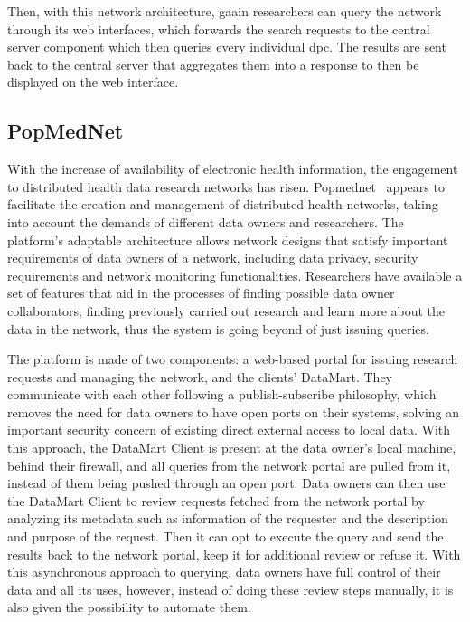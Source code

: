 Then, with this network architecture, \gls{gaain} researchers can query the network through its web interfaces, which forwards the search requests to the central server component which then queries every individual \gls{dpc}.
The results are sent back to the central server that aggregates them into a response to then be displayed on the web interface.

\subsection*{PopMedNet}
With the increase of availability of electronic health information, the engagement to distributed health data research networks has risen.
Popmednet~\cite{popmednet} appears to facilitate the creation and management of distributed health networks, taking into account the demands of different data owners and researchers.
The platform's adaptable architecture allows network designs that satisfy important requirements of data owners of a network, including data privacy, security requirements and network monitoring functionalities.
Researchers have available a set of features that aid in the processes of finding possible data owner collaborators, finding previously carried out research and learn more about the data in the network, thus the system is going beyond of just issuing queries.

The platform is made of two components: a web-based portal for issuing research requests and managing the network, and the clients' DataMart.
They communicate with each other following a publish-subscribe philosophy, which removes the need for data owners to have open ports on their systems, solving an important security concern of existing direct external access to local data.
With this approach, the DataMart Client is present at the data owner's local machine, behind their firewall, and all queries from the network portal are pulled from it, instead of them being pushed through an open port.
Data owners can then use the DataMart Client to review requests fetched from the network portal by analyzing its metadata such as information of the requester and the description and purpose of the request.
Then it can opt to execute the query and send the results back to the network portal, keep it for additional review or refuse it.
With this asynchronous approach to querying, data owners have full control of their data and all its uses, however, instead of doing these review steps manually, it is also given the possibility to automate them.


